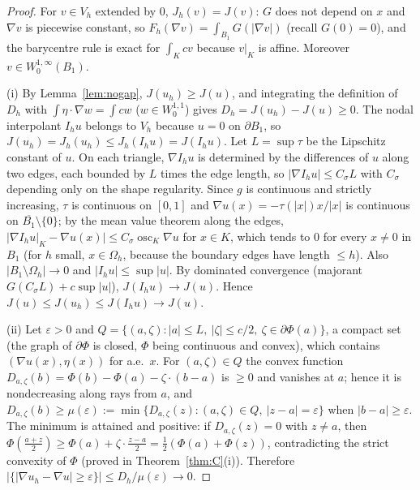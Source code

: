 \documentclass[11pt]{amsart}
\theoremstyle{definition}
\theoremstyle{remark}
\numberwithin{equation}{section}
\newcommand{\abs}[1]{\lvert #1\rvert}
\begin{document}
\begin{proof}
For $v\in V_h$ extended by $0$, $J_h(v)=J(v)$: $G$ does not depend on $x$ and $\nabla v$ is piecewise constant, so $F_h(\nabla v)=\int_{B_1}G(\abs{\nabla v})$ (recall $G(0)=0$), and the barycentre rule is exact for $\int_K cv$ because $v|_K$ is affine. Moreover $v\in W^{1,\infty}_0(B_1)$.

(i) By Lemma~\ref{lem:nogap}, $J(u_h)\ge J(u)$, and integrating the definition of $D_h$ with $\int\eta\cdot\nabla w=\int cw$ ($w\in W^{1,1}_0$) gives $D_h=J(u_h)-J(u)\ge0$. The nodal interpolant $I_hu$ belongs to $V_h$ because $u=0$ on $\partial B_1$, so $J(u_h)=J_h(u_h)\le J_h(I_hu)=J(I_hu)$. Let $L=\sup\tau$ be the Lipschitz constant of $u$. On each triangle, $\nabla I_hu$ is determined by the differences of $u$ along two edges, each bounded by $L$ times the edge length, so $\abs{\nabla I_hu}\le C_\sigma L$ with $C_\sigma$ depending only on the shape regularity. Since $g$ is continuous and strictly increasing, $\tau$ is continuous on $[0,1]$ and $\nabla u(x)=-\tau(\abs x)x/\abs x$ is continuous on $\overline{B_1}\setminus\{0\}$; by the mean value theorem along the edges, $\abs{\nabla I_hu|_K-\nabla u(x)}\le C_\sigma\operatorname{osc}_K\nabla u$ for $x\in K$, which tends to $0$ for every $x\ne0$ in $B_1$ (for $h$ small, $x\in\Omega_h$, because the boundary edges have length $\le h$). Also $\abs{B_1\setminus\Omega_h}\to0$ and $\abs{I_hu}\le\sup\abs u$. By dominated convergence (majorant $G(C_\sigma L)+c\sup\abs u$), $J(I_hu)\to J(u)$. Hence $J(u)\le J(u_h)\le J(I_hu)\to J(u)$.

(ii) Let $\varepsilon>0$ and $Q=\{(a,\zeta):\abs a\le L,\ \abs\zeta\le c/2,\ \zeta\in\partial\Phi(a)\}$, a compact set (the graph of $\partial\Phi$ is closed, $\Phi$ being continuous and convex), which contains $(\nabla u(x),\eta(x))$ for a.e.\ $x$. For $(a,\zeta)\in Q$ the convex function $D_{a,\zeta}(b)=\Phi(b)-\Phi(a)-\zeta\cdot(b-a)$ is $\ge0$ and vanishes at $a$; hence it is nondecreasing along rays from $a$, and $D_{a,\zeta}(b)\ge\mu(\varepsilon):=\min\{D_{a,\zeta}(z):(a,\zeta)\in Q,\ \abs{z-a}=\varepsilon\}$ when $\abs{b-a}\ge\varepsilon$. The minimum is attained and positive: if $D_{a,\zeta}(z)=0$ with $z\ne a$, then $\Phi(\frac{a+z}2)\ge\Phi(a)+\zeta\cdot\frac{z-a}2=\frac12(\Phi(a)+\Phi(z))$, contradicting the strict convexity of $\Phi$ (proved in Theorem~\ref{thm:C}(i)). Therefore $\abs{\{\abs{\nabla u_h-\nabla u}\ge\varepsilon\}}\le D_h/\mu(\varepsilon)\to0$.


\end{proof}
\end{document}
